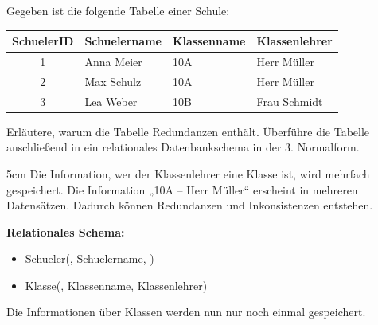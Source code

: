 \question[4]
Gegeben ist die folgende Tabelle einer Schule:

\begin{center}
\begin{tabular}{|c|l|l|l|}
\hline
SchuelerID & Schuelername & Klassenname & Klassenlehrer \\
\hline
1 & Anna Meier & 10A & Herr Müller \\
2 & Max Schulz & 10A & Herr Müller \\
3 & Lea Weber & 10B & Frau Schmidt \\
\hline
\end{tabular}
\end{center}

Erläutere, warum die Tabelle Redundanzen enthält.
Überführe die Tabelle anschließend in ein relationales Datenbankschema in der 3. Normalform.

\begin{solutionbox}{5cm}
Die Information, wer der Klassenlehrer eine Klasse ist, wird mehrfach gespeichert. Die Information 
„10A -- Herr Müller“ erscheint in mehreren Datensätzen.
Dadurch können Redundanzen und Inkonsistenzen entstehen.

\vspace{0.3cm}

\textbf{Relationales Schema:}

\begin{itemize}
\item Schueler(, Schuelername, )
\item Klasse(, Klassenname, Klassenlehrer)
\end{itemize}

Die Informationen über Klassen werden nun nur noch einmal gespeichert.
\end{solutionbox}